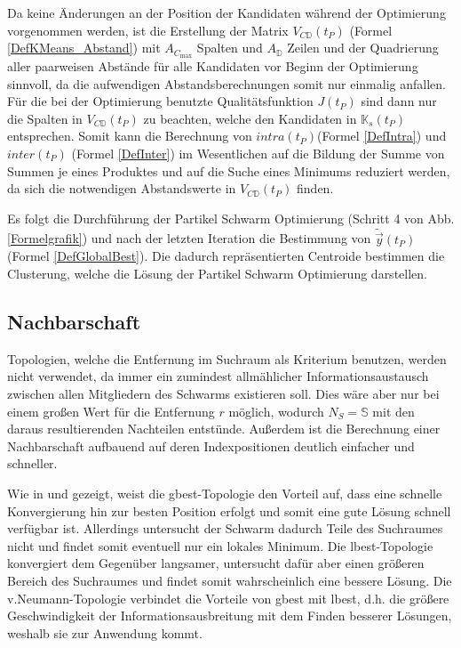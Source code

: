   \noindent Da keine Änderungen an der Position der Kandidaten während der Optimierung vorgenommen werden, ist die Erstellung der Matrix $V_{C\mathbb{D}}(t_P)$ (Formel \ref{DefKMeans_Abstand}) mit $A_{C_\textrm{max}}$ Spalten und $A_{\mathbb{D}}$ Zeilen und der Quadrierung aller paarweisen Abstände für alle Kandidaten vor Beginn der Optimierung sinnvoll, da die aufwendigen Abstandsberechnungen somit nur einmalig anfallen. Für die bei der Optimierung benutzte Qualitätsfunktion $J(t_P)$ sind dann nur die Spalten in $V_{C\mathbb{D}}(t_P)$ zu beachten, welche den Kandidaten in $\mathbb{K}_s(t_P)$ entsprechen. Somit kann die Berechnung von $intra(t_P)$\linebreak (Formel \ref{DefIntra}) und $inter(t_P)$ (Formel \ref{DefInter}) im Wesentlichen auf die Bildung der Summe von Summen je eines Produktes und auf die Suche eines Minimums reduziert werden, da sich die notwendigen Abstandswerte in $V_{C\mathbb{D}}(t_P)$ finden.

  Es folgt die Durchführung der Partikel Schwarm Optimierung (Schritt 4 von Abb. \ref{Formelgrafik}) und nach der letzten Iteration die Bestimmung von $\tilde{\vec{y}}(t_P)$ (Formel \ref{DefGlobalBest}). Die dadurch repräsentierten Centroide bestimmen die Clusterung, welche die Lösung der Partikel Schwarm Optimierung darstellen.

\subsection{Nachbarschaft}
  Topologien, welche die Entfernung im Suchraum als Kriterium benutzen, werden nicht verwendet, da immer ein zumindest allmählicher Informationsaustausch zwischen allen Mitgliedern des Schwarms existieren soll. Dies wäre aber nur bei einem großen Wert für die Entfernung $r$ möglich, wodurch $N_S=\mathbb{S}$ mit den daraus resultierenden Nachteilen entstünde.
  Außerdem ist die Berechnung einer Nachbarschaft aufbauend auf deren Indexpositionen deutlich einfacher und schneller.
  
  Wie in \cite{Omran2005} und \cite{Huang2005} gezeigt, weist die gbest-Topologie den Vorteil auf, dass eine schnelle Konvergierung hin zur besten Position erfolgt und somit eine gute Lösung schnell verfügbar ist. Allerdings untersucht der Schwarm dadurch Teile des Suchraumes nicht und findet somit eventuell nur ein lokales Minimum. Die lbest-Topologie konvergiert dem Gegenüber langsamer, untersucht dafür aber einen größeren Bereich des Suchraumes und findet somit wahrscheinlich eine bessere Lösung. Die v.Neumann-Topologie verbindet die Vorteile von gbest mit lbest, d.h. die größere Geschwindigkeit der Informationsausbreitung mit dem Finden besserer Lösungen, weshalb sie zur Anwendung kommt.

